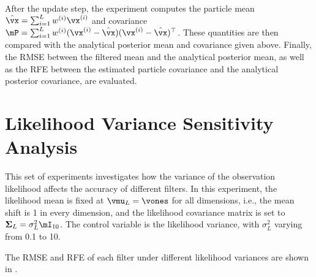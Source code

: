 After the update step, the experiment computes the particle mean $\hat{\vx} = \sum_{i=1}^L w^{(i)} \vx^{(i)}$ and covariance $\mP = \sum_{i=1}^L w^{(i)} (\vx^{(i)} - \hat{\vx})(\vx^{(i)} - \hat{\vx})^{\top}$. These quantities are then compared with the analytical posterior mean and covariance given above. Finally, the RMSE between the filtered mean and the analytical posterior mean, as well as the RFE between the estimated particle covariance and the analytical posterior covariance, are evaluated.
\section{Likelihood Variance Sensitivity Analysis}
\label{sec:likelihood_sensitivity}

This set of experiments investigates how the variance of the observation likelihood affects the accuracy of different filters. In this experiment, the likelihood mean is fixed at $\vmu_L = \vones$ for all dimensions, i.e., the mean shift is 1 in every dimension, and the likelihood covariance matrix is set to $\boldsymbol{\Sigma}_L = \sigma_L^2 \mI_{10}$. The control variable is the likelihood variance, with $\sigma_L^2$ varying from 0.1 to 10.

The RMSE and RFE of each filter under different likelihood variances are shown in .

